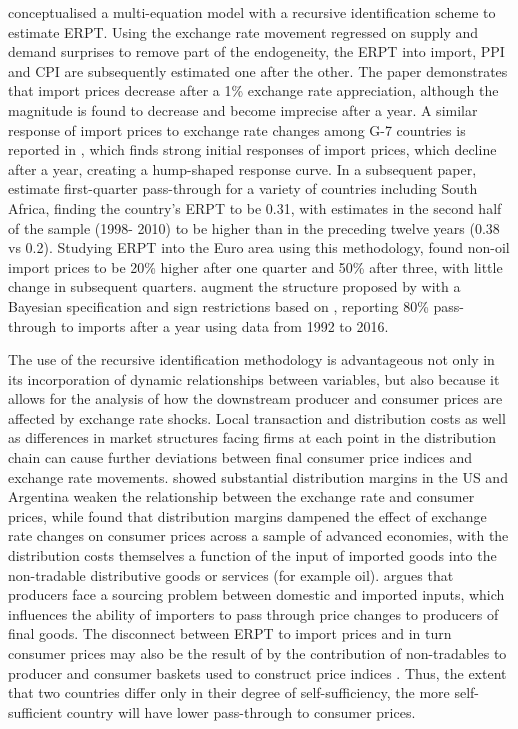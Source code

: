 \documentclass[12pt]{article}
\begin{document}
\textcite{mccarthy1999} conceptualised a multi-equation model with a recursive identification scheme to estimate ERPT. Using the exchange rate movement regressed on supply and demand surprises to remove part of the endogeneity, the ERPT into import, PPI and CPI are subsequently estimated one after the other. The paper demonstrates that import prices decrease after a 1\% exchange rate appreciation, although the magnitude is found to decrease and become imprecise after a year. A similar response of import prices to exchange rate changes among G-7 countries is reported in \textcite{choudhri2005explaining}, which finds strong initial responses of import prices, which decline after a year, creating a hump-shaped response curve. In a subsequent paper,  \textcite{choudhri2015exchange} estimate first-quarter pass-through for a variety of countries including South Africa, finding the country's ERPT to be 0.31, with estimates in the second half of the sample (1998- 2010) to be higher than in the preceding twelve years (0.38 vs 0.2). Studying ERPT into the Euro area using this methodology, \textcite{hahn2003} found non-oil import prices to be 20\% higher after one quarter and 50\% after three, with little change in subsequent quarters. \textcite{comunale2017erpt} augment the structure proposed by \textcite{mccarthy1999} with a Bayesian specification and sign restrictions based on \textcite{AnWang2011}, reporting 80\% pass-through to imports after a year using data from 1992 to 2016. 

The use of the recursive identification methodology is advantageous not only in its incorporation of dynamic relationships between variables, but also because it allows for the analysis of how the downstream producer and consumer prices are affected by exchange rate shocks. Local transaction and distribution costs as well as differences in market structures facing firms at each point in the distribution chain can cause further deviations between final consumer price indices and exchange rate movements. \textcite{burstein2003distribution} showed substantial distribution margins  in the US and Argentina weaken the relationship between the exchange rate and consumer prices, while \textcite{goldberg2010sensitivity} found that distribution margins dampened the effect of exchange rate changes on consumer prices across a sample of advanced economies, with the distribution costs themselves a function of the input of imported goods into the non-tradable distributive goods or services (for example oil). \textcite{engel2002responsiveness} argues that producers face a sourcing problem between domestic and imported inputs, which influences the ability of importers to pass through price changes to producers of final goods. The disconnect between ERPT to import prices and in turn consumer prices may also be the result of by the contribution of non-tradables to producer and consumer baskets used to construct price indices \textcite{obstfeld2000new}. Thus, the extent that two countries differ only in their degree of self-sufficiency, the more self-sufficient country will have lower pass-through to consumer prices. 
\end{document}
